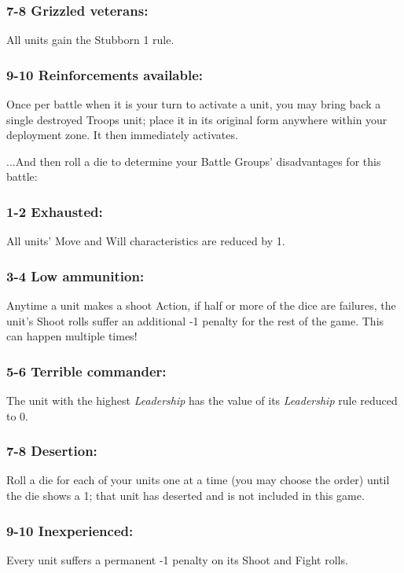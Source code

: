 \begin{multicols}{2}
\subsubsection*{7-8 Grizzled veterans:} All units gain the Stubborn 1 rule.

\subsubsection*{9-10 Reinforcements available:} Once per battle when it is your turn to activate a unit, you may bring back a single destroyed Troops unit; place it in its original form anywhere within your deployment zone. It then immediately activates.

\vspace{2em}

...And then roll a die to determine your Battle Groups' disadvantages for this battle:

\subsubsection*{1-2 Exhausted:} All units' Move and Will characteristics are reduced by 1.

\subsubsection*{3-4 Low ammunition:} Anytime a unit makes a shoot Action, if half or more of the dice are failures, the unit's Shoot rolls suffer an additional -1 penalty for the rest of the game. This can happen multiple times!

\subsubsection*{5-6 Terrible commander:} The unit with the highest \textit{Leadership} has the value of its \textit{Leadership} rule reduced to 0.

\subsubsection*{7-8 Desertion:} Roll a die for each of your units one at a time (you may choose the order) until the die shows a 1; that unit has deserted and is not included in this game.

\subsubsection*{9-10 Inexperienced:} Every unit suffers a permanent -1 penalty on its Shoot and Fight rolls.





\end{multicols}
